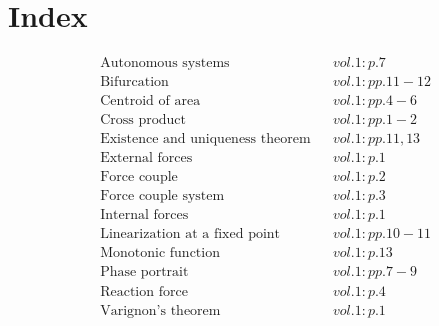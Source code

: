 \documentclass[a4paper]{article}
\begin{document}
 
\section*{Index} 
\begin{align*} 
&\text{Autonomous systems}&& vol. 1: p. 7\\
&\text{Bifurcation}&& vol. 1: pp. 11-12\\
&\text{Centroid of area}&& vol. 1: pp. 4-6\\
&\text{Cross product}&& vol. 1: pp. 1-2\\
&\text{Existence and uniqueness theorem}&& vol. 1: pp. 11, 13\\
&\text{External forces}&& vol. 1: p. 1\\
&\text{Force couple}&& vol. 1: p. 2\\
&\text{Force couple system}&& vol. 1: p. 3\\
&\text{Internal forces}&& vol. 1: p. 1\\
&\text{Linearization at a fixed point}&& vol. 1: pp. 10-11\\
&\text{Monotonic function}&& vol. 1: p. 13\\
&\text{Phase portrait}&& vol. 1: pp. 7-9\\
&\text{Reaction force}&& vol. 1: p. 4\\
&\text{Varignon's theorem}&& vol. 1: p. 1\\
\end{align*} 
\end{document}
